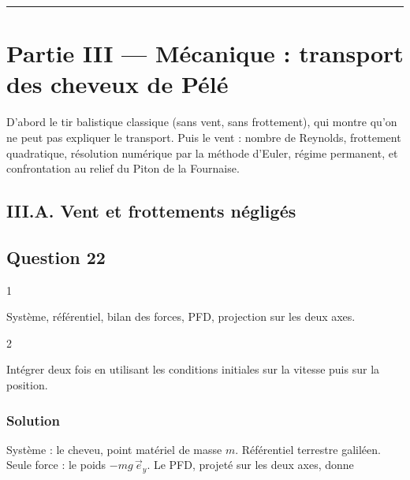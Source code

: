 \documentclass[11pt,a4paper]{article}
\begin{document}
\begin{center}\rule{0.5\linewidth}{0.5pt}\end{center}

\hypertarget{partie-iii-muxe9canique-transport-des-cheveux-de-puxe9luxe9}{%
\section{Partie III --- Mécanique : transport des cheveux de Pélé}\label{partie-iii-muxe9canique-transport-des-cheveux-de-puxe9luxe9}}

D'abord le tir balistique classique (sans vent, sans frottement), qui montre qu'on ne peut pas expliquer le transport. Puis le vent : nombre de Reynolds, frottement quadratique, résolution numérique par la méthode d'Euler, régime permanent, et confrontation au relief du Piton de la Fournaise.

\hypertarget{iii.a.-vent-et-frottements-nuxe9gliguxe9s}{%
\subsection{III.A. Vent et frottements négligés}\label{iii.a.-vent-et-frottements-nuxe9gliguxe9s}}

\hypertarget{question-22}{%
\subsection{Question 22}\label{question-22}}

\begin{indication}{1}

Système, référentiel, bilan des forces, PFD, projection sur les deux axes.

\end{indication}

\begin{indication}{2}

Intégrer deux fois en utilisant les conditions initiales sur la vitesse puis sur la position.

\end{indication}

\hypertarget{solution-21}{%
\subsubsection{Solution}\label{solution-21}}

Système : le cheveu, point matériel de masse \(m\). Référentiel terrestre galiléen. Seule force : le poids \(-mg\,\vec e_y\). Le PFD, projeté sur les deux axes, donne
\end{document}
